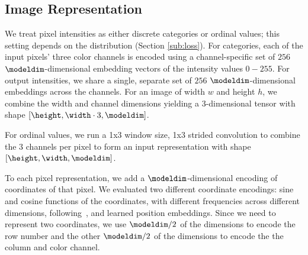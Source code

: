 

\subsection{Image Representation}\label{sec:image-rep}
We treat pixel intensities as either discrete categories or ordinal values; this setting depends on the distribution (Section \ref{sub:loss}).
For categories, each of the input pixels' three color channels is encoded using a channel-specific set of $256$ $\modeldim$-dimensional embedding vectors of the intensity values $0-255$. For output intensities, we share a single, separate set of $256$ $\modeldim$-dimensional embeddings across the channels.
For an image of width $w$ and height $h$, we combine the width and channel dimensions yielding a 3-dimensional tensor with shape $[\height, \width \cdot 3, \modeldim]$.

For ordinal values, we run a 1x3 window size, 1x3 strided convolution to combine the $3$ channels per pixel to form an input representation with shape $[\height, \width, \modeldim]$.

To each pixel representation, we add a $\modeldim$-dimensional encoding of coordinates of that pixel. We evaluated two different coordinate encodings: sine and cosine functions of the coordinates, with different frequencies across different dimensions, following~\cite{aiayn}, and learned position embeddings. Since we need to represent two coordinates, we use $\modeldim/2$ of the dimensions to encode the row number and the other $\modeldim/2$ of the dimensions to encode the the column and color channel.

